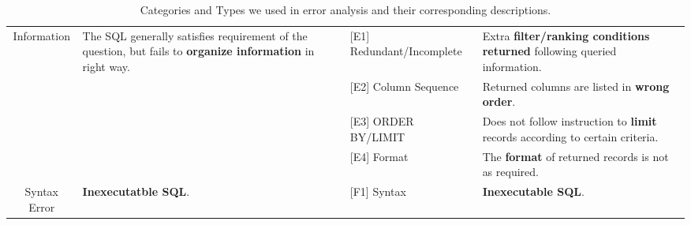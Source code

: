 \begin{table*}[t]
\begin{adjustbox}{max width=\textwidth}
\begin{tabular}{c p{5.5cm} l p{6cm} }
    \\
\midrule
\multirow{4}{*}{Information}
    & \multirow{4}{=}{The SQL generally satisfies requirement of the question, but fails to \textbf{organize information} in right way.}
    & [E1] Redundant/Incomplete 
    & Extra \textbf{filter/ranking conditions returned} following queried information.
    \\
    & & [E2] Column Sequence & Returned columns are listed in \textbf{wrong order}.
    \\
    & & [E3] ORDER BY/LIMIT & Does not follow instruction to \textbf{limit} records according to certain criteria.
    \\
    & & [E4] Format & The \textbf{format} of returned records is not as required.
    \\
\midrule
Syntax Error 
    & \textbf{Inexecutatble SQL}.
    & [F1] Syntax 
    & \textbf{Inexecutable SQL}.
    \\ 
\bottomrule
\end{tabular}
\end{adjustbox}
\caption{Categories and Types we used in error analysis and their corresponding descriptions.}
\label{table:ErrorCategoryDescription}
\end{table*}